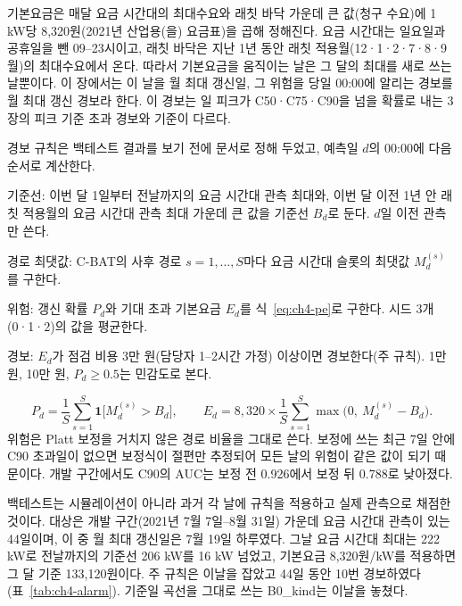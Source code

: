 
기본요금은 매달 요금 시간대의 최대수요와 래칫 바닥 가운데 큰 값(청구 수요)에 1 kW당 8,320원(2021년 산업용(을) 요금표)을 곱해 정해진다. 요금 시간대는 일요일과 공휴일을 뺀 09--23시이고, 래칫 바닥은 지난 1년 동안 래칫 적용월(12·1·2·7·8·9월)의 최대수요에서 온다. 따라서 기본요금을 움직이는 날은 그 달의 최대를 새로 쓰는 날뿐이다. 이 장에서는 이 날을 월 최대 갱신일, 그 위험을 당일 00:00에 알리는 경보를 월 최대 갱신 경보라 한다. 이 경보는 일 피크가 C50·C75·C90을 넘을 확률로 내는 3장의 피크 기준 초과 경보와 기준이 다르다.

경보 규칙은 백테스트 결과를 보기 전에 문서로 정해 두었고, 예측일 $d$의 00:00에 다음 순서로 계산한다.
\begin{hwplist}
\item 기준선: 이번 달 1일부터 전날까지의 요금 시간대 관측 최대와, 이번 달 이전 1년 안 래칫 적용월의 요금 시간대 관측 최대 가운데 큰 값을 기준선 $B_d$로 둔다. $d$일 이전 관측만 쓴다.
\item 경로 최댓값: C-BAT의 사후 경로 $s=1,\dots,S$마다 요금 시간대 슬롯의 최댓값 $M_d^{(s)}$를 구한다.
\item 위험: 갱신 확률 $P_d$와 기대 초과 기본요금 $E_d$를 식~\eqref{eq:ch4-pe}로 구한다. 시드 3개(0·1·2)의 값을 평균한다.
\item 경보: $E_d$가 점검 비용 3만 원(담당자 1--2시간 가정) 이상이면 경보한다(주 규칙). 1만 원, 10만 원, $P_d \ge 0.5$는 민감도로 본다.
\end{hwplist}
\begin{equation}
P_d = \frac{1}{S}\sum_{s=1}^{S} \mathbf{1}\bigl[M_d^{(s)} > B_d\bigr], \qquad
E_d = 8{,}320 \times \frac{1}{S}\sum_{s=1}^{S} \max\bigl(0,\ M_d^{(s)} - B_d\bigr).
\label{eq:ch4-pe}
\end{equation}
위험은 Platt 보정을 거치지 않은 경로 비율을 그대로 쓴다. 보정에 쓰는 최근 7일 안에 C90 초과일이 없으면 보정식이 절편만 추정되어 모든 날의 위험이 같은 값이 되기 때문이다. 개발 구간에서도 C90의 AUC는 보정 전 0.926에서 보정 뒤 0.788로 낮아졌다.

백테스트는 시뮬레이션이 아니라 과거 각 날에 규칙을 적용하고 실제 관측으로 채점한 것이다. 대상은 개발 구간(2021년 7월 7일--8월 31일) 가운데 요금 시간대 관측이 있는 44일이며, 이 중 월 최대 갱신일은 7월 19일 하루였다. 그날 요금 시간대 최대는 222 kW로 전날까지의 기준선 206 kW를 16 kW 넘었고, 기본요금 8,320원/kW를 적용하면 그 달 기준 133,120원이다. 주 규칙은 이날을 잡았고 44일 동안 10번 경보하였다(표~\ref{tab:ch4-alarm}). 기준일 곡선을 그대로 쓰는 B0\_kind는 이날을 놓쳤다.

